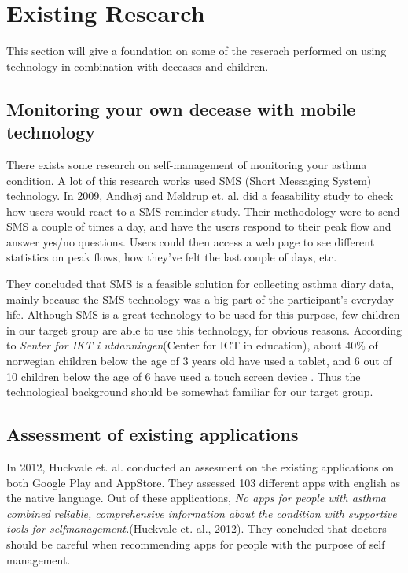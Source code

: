 \section{Existing Research}
\label{sec:existing-research}

This section will give a foundation on some of the reserach performed on using technology in combination with deceases and children. 


\subsection{Monitoring your own decease with mobile technology}
There exists some research on self-management of monitoring your asthma condition. A lot of this research works used SMS (Short Messaging System) technology. In 2009, Andh\o j and M\o ldrup et. al.\cite{anhoj2004feasibility} did a feasability study to check how users would react to a SMS-reminder study. Their methodology were to send SMS a couple of times a day, and have the users respond to their peak flow and answer yes/no questions. Users could then access a web page to see different statistics on peak flows, how they've felt the last couple of days, etc.

They concluded that SMS is a feasible solution for collecting asthma diary data, mainly because the SMS technology was a big part of the participant's everyday life. Although SMS is a great technology to be used for this purpose, few children in our target group are able to use this technology, for obvious reasons. According to \emph{Senter for IKT i utdanningen}(Center for ICT in education), about 40\% of norwegian children below the age of 3 years old have used a tablet, and 6 out of 10 children below the age of 6 have used a touch screen device \cite{nrkchilduse}. Thus the technological background should be somewhat familiar for our target group. 


\subsection{Assessment of existing applications}
In 2012, Huckvale et. al. \cite{huckvale2012apps} conducted an assesment on the existing applications on both Google Play and AppStore. They assessed 103 different apps with english as the native language. Out of these applications, \emph{No apps for people with asthma combined reliable, comprehensive information about the condition with supportive tools for self­management.}(Huckvale et. al., 2012). They concluded that doctors should be careful when recommending apps for people with the purpose of self management. 


